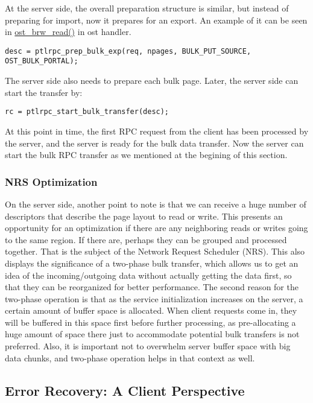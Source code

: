 At the server side, the overall preparation structure is similar, but instead
of preparing for import, now it prepares for an export. An example of it can be
seen in \url{ost_brw_read()} in ost handler.

\begin{Verbatim}
desc = ptlrpc_prep_bulk_exp(req, npages, BULK_PUT_SOURCE, OST_BULK_PORTAL);
\end{Verbatim}

The server side also needs to prepare each bulk page. Later, the server side
can start the transfer by:

\begin{Verbatim}
rc = ptlrpc_start_bulk_transfer(desc);
\end{Verbatim}

At this point in time, the first RPC request from the client has been
processed by the server, and the server is ready for the bulk data transfer.
Now the server can start the bulk RPC transfer as we mentioned at the
begining of this section.

\subsubsection*{NRS Optimization}

On the server side, another point to note is that we can receive a huge number
of descriptors that describe the page layout to read or write. This presents an
opportunity for an optimization if there are any neighboring reads or writes
going to the same region. If there are, perhaps they can be grouped and
processed together. That is the subject of the Network Request Scheduler
(NRS). This also displays the significance of a two-phase bulk transfer, which
allows us to get an idea of the incoming/outgoing data without actually getting the
data first, so that they can be reorganized for better performance. The second
reason for the two-phase operation is that as the service initialization
increases on the server, a certain amount of buffer space is allocated. When
client requests come in, they will be buffered in this space first before further
processing, as pre-allocating a huge amount of space there just to accommodate
potential bulk transfers is not preferred. Also, it is important not to overwhelm
server buffer space with big data chunks, and two-phase operation helps in that
context as well.

\subsection{Error Recovery: A Client Perspective}

